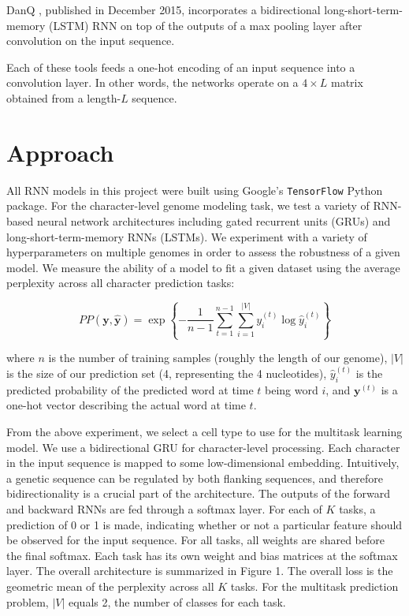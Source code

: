 \documentclass{article} %
\begin{document}
DanQ \cite{quang2015danq}, published in December 2015, incorporates a bidirectional long-short-term-memory (LSTM) RNN on top of the outputs of a max pooling layer after convolution on the input sequence.

Each of these tools feeds a one-hot encoding of an input sequence into a convolution layer. In other words, the networks operate on a $4\times L$ matrix obtained from a length-$L$ sequence. 

\section{Approach}

All RNN models in this project were built using Google's \texttt{TensorFlow} Python package. For the character-level genome modeling task, we test a variety of RNN-based neural network architectures including gated recurrent units (GRUs) and long-short-term-memory RNNs (LSTMs). We experiment with a variety of hyperparameters on multiple genomes in order to assess the robustness of a given model. We measure the ability of a model to fit a given dataset using the average perplexity across all character prediction tasks:

$$
	PP(\mathbf{y},\mathbf{\hat{y}}) = \exp \left\{-\frac{1}{n-1} \sum_{t=1}^{n-1} \sum_{i=1}^{|V|} y_i^{(t)} \log \hat{y}_i^{(t)}\right\}
$$

where $n$ is the number of training samples (roughly the length of our genome), $|V|$ is the size of our prediction set (4, representing the 4 nucleotides), $\hat{y}^{(t)}_i$ is the predicted probability of the predicted word at time $t$ being word $i$, and $\mathbf{y}^{(t)}$ is a one-hot vector describing the actual word at time $t$.

From the above experiment, we select a cell type to use for the multitask learning model. We use a bidirectional GRU for character-level processing. Each character in the input sequence is mapped to some low-dimensional embedding. Intuitively, a genetic sequence can be regulated by both flanking sequences, and therefore bidirectionality is a crucial part of the architecture. The outputs of the forward and backward RNNs are fed through a softmax layer. For each of $K$ tasks, a prediction of 0 or 1 is made, indicating whether or not a particular feature should be observed for the input sequence. For all tasks, all weights are shared before the final softmax. Each task has its own weight and bias matrices at the softmax layer. The overall architecture is summarized in Figure 1. The overall loss is the geometric mean of the perplexity across all $K$ tasks. For the multitask prediction problem, $|V|$ equals 2, the number of classes for each task. 
\end{document}
